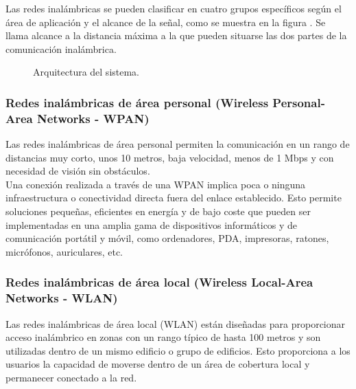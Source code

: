 	Las redes inalámbricas se pueden clasificar en cuatro grupos específicos según el área de aplicación y el alcance de la señal, como se muestra en la figura . Se llama alcance a la distancia máxima a la que pueden situarse las dos partes de la comunicación inalámbrica.
	
	\begin{figure}[htbp!]
		\centering
		\caption{Arquitectura del sistema.}
		\label{fig:tiposRedes}
	\end{figure}
	
	
	\subsubsection{\textbf{Redes inalámbricas de área personal (Wireless Personal-Area Networks - WPAN)}}
	Las redes inalámbricas de área personal permiten la comunicación en un rango de distancias muy corto, unos 10 metros, baja velocidad, menos de 1 Mbps y con necesidad de visión sin obstáculos.\\
	
	Una conexión realizada a través de una WPAN implica poca o ninguna infraestructura o conectividad directa fuera del enlace establecido. Esto permite soluciones pequeñas, eficientes en energía y de bajo coste que pueden ser implementadas en una amplia gama de dispositivos informáticos y de comunicación portátil y móvil, como ordenadores, PDA, impresoras, ratones, micrófonos, auriculares, etc.
	
	\subsubsection{\textbf{Redes inalámbricas de área local (Wireless Local-Area Networks - WLAN)}}
	Las redes inalámbricas de área local (WLAN) están diseñadas para proporcionar acceso inalámbrico en zonas con un rango típico de hasta 100 metros y son utilizadas dentro de un mismo edificio o grupo de edificios. Esto proporciona a los usuarios la capacidad de moverse dentro de un área de cobertura local y permanecer conectado a la red. 
	
